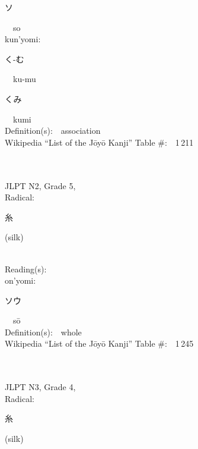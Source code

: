 \begin{multicols}{2}
{\hspace*{2em}}{\begin{CJK}{UTF8}{min} ソ \end{CJK}}\ \ so\ \ \\
{\hspace*{1em}}kun'yomi:\ \ \\
{\hspace*{2em}}{\begin{CJK}{UTF8}{min} く-む \end{CJK}}\ \ ku-mu\ \ \\
{\hspace*{2em}}{\begin{CJK}{UTF8}{min} くみ \end{CJK}}\ \ kumi\ \ \\
Definition(s):\ \ association \\
Wikipedia ``List of the J\=oy\=o Kanji'' Table \#:\ \ 1\,211 \\
\ \ \\
{\fontsize{34pt}{40pt}  }\ \ \\  %
{JLPT N2, Grade 5, \\Radical:\ \ {\begin{CJK}{UTF8}{min} 糸 \end{CJK}} (silk) } \\
Reading(s):\ \ \\
{\hspace*{1em}}on'yomi:\ \ \\
{\hspace*{2em}}{\begin{CJK}{UTF8}{min} ソウ \end{CJK}}\ \ s\=o\ \ \\
Definition(s):\ \ whole \\
Wikipedia ``List of the J\=oy\=o Kanji'' Table \#:\ \ 1\,245 \\
\ \ \\
{\fontsize{34pt}{40pt}  }\ \ \\  %
{JLPT N3, Grade 4, \\Radical:\ \ {\begin{CJK}{UTF8}{min} 糸 \end{CJK}} (silk) } \\

\end{multicols}
